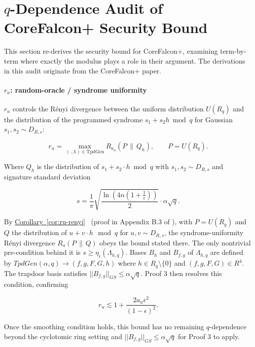 \section{$q$-Dependence Audit of CoreFalcon+ Security Bound}

This section re-derives the security bound for CoreFalcon+, examining term-by-term 
where exactly the modulus plays a role in their argument. The derivations in this 
audit originate from the CoreFalcon+ paper.

\paragraph{\texorpdfstring{\(r_u\): random-oracle / syndrome
uniformity}{r\_u: random-oracle / syndrome uniformity}}\label{r_u-random-oracle-syndrome-uniformity}

\(r_u\) controls the Rényi divergence between the uniform distribution
\(U(R_q)\) and the distribution of the programmed syndrome
\(s_1 + s_2 h \bmod q\) for Gaussian \(s_1, s_2 \sim D_{R,s}\):

\[
r_u = \max_{(\cdot,h)\in \mathrm{TpdGen}} R_{a_u}(P \,\|\, Q_h), \qquad P = U(R_q).
\]

Where \(Q_h\) is the distribution of \(s_1 + s_2\cdot h \bmod q\) with
\(s_1, s_2 \sim D_{R, s}\) and signature standard deviation

\[
s = \frac{1}{\pi} \sqrt{\frac{\ln\!\left(4n\left(1+\frac{1}{\epsilon}\right)\right)}{2}} \cdot \alpha \sqrt{q}.
\]

By \hyperref[cor:ru-renyi]{Corollary~\ref*{cor:ru-renyi}}~\cite{Fouque2024CoreFalcon}
(proof in Appendix B.3 of \cite{Fouque2024CoreFalcon}), with \(P = U(R_q)\) and
\(Q\) the distribution of \(u + v \cdot h \mod q\) for \(u, v \sim D_{R,s}\),
the syndrome-uniformity R\'enyi divergence \(R_a(P \,\|\, Q)\) obeys the bound
stated there. The only nontrivial pre-condition behind it is 
\(s \ge \eta_{\epsilon}(\Lambda_{h,q})\). Bases \(B_h\) and \(B_{f,g}\)
of \(\Lambda_{h, q}\) are defined by
\(TpdGen(\alpha, q) \rightarrow (f, g, F, G, h)\) where
\(h \in R_q \setminus \{0\}\) and \((f, g, F, G) \in R^4\). The trapdoor
basis satisfies \(||B_{f,g}||_{GS} \le \alpha\sqrt{q}\). Proof 3 then resolves this condition, confirming

\[
r_u \lesssim 1 + \frac{2a_u\epsilon^2}{(1-\epsilon)^2}.
\]

Once the smoothing condition holds, this bound has no remaining
\(q\)-dependence beyond the cyclotomic ring setting and \(||B_{f,g}||_{GS} \le \alpha\sqrt{q}\) for 
Proof 3 to apply.

